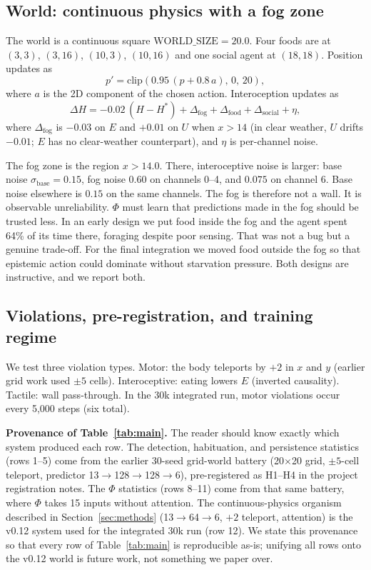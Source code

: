 \documentclass[11pt,a4paper]{article}
\begin{document}
\subsection{World: continuous physics with a fog zone}

The world is a continuous square $\mathrm{WORLD\_SIZE}=20.0$. Four foods are at $(3,3)$, $(3,16)$, $(10,3)$, $(10,16)$ and one social agent at $(18,18)$. Position updates as
\begin{equation}
p' = \mathrm{clip}(0.95 \,(p + 0.8\,a),\, 0,\, 20),
\end{equation}
where $a$ is the 2D component of the chosen action. Interoception updates as
\begin{equation}
\Delta H = -0.02\,(H-H^*) + \Delta_{\mathrm{fog}} + \Delta_{\mathrm{food}} + \Delta_{\mathrm{social}} + \eta,
\end{equation}
where $\Delta_{\mathrm{fog}}$ is $-0.03$ on $E$ and $+0.01$ on $U$ when $x>14$ (in clear weather, $U$ drifts $-0.01$; $E$ has no clear-weather counterpart), and $\eta$ is per-channel noise.

The fog zone is the region $x>14.0$. There, interoceptive noise is larger: base noise $\sigma_{\mathrm{base}}=0.15$, fog noise $0.60$ on channels 0--4, and $0.075$ on channel 6. Base noise elsewhere is $0.15$ on the same channels. The fog is therefore not a wall. It is observable unreliability. $\Phi$ must learn that predictions made in the fog should be trusted less. In an early design we put food inside the fog and the agent spent 64\% of its time there, foraging despite poor sensing. That was not a bug but a genuine trade-off. For the final integration we moved food outside the fog so that epistemic action could dominate without starvation pressure. Both designs are instructive, and we report both.

\subsection{Violations, pre-registration, and training regime}

We test three violation types. Motor: the body teleports by $+2$ in $x$ and $y$ (earlier grid work used $\pm5$ cells). Interoceptive: eating lowers $E$ (inverted causality). Tactile: wall pass-through. In the 30k integrated run, motor violations occur every 5,000 steps (six total).

\textbf{Provenance of Table~\ref{tab:main}.} The reader should know exactly which system produced each row. The detection, habituation, and persistence statistics (rows 1--5) come from the earlier 30-seed grid-world battery (20$\times$20 grid, $\pm5$-cell teleport, predictor 13$\rightarrow$128$\rightarrow$128$\rightarrow$6), pre-registered as H1--H4 in the project registration notes. The $\Phi$ statistics (rows 8--11) come from that same battery, where $\Phi$ takes 15 inputs without attention. The continuous-physics organism described in Section~\ref{sec:methods} (13$\rightarrow$64$\rightarrow$6, $+2$ teleport, attention) is the v0.12 system used for the integrated 30k run (row 12). We state this provenance so that every row of Table~\ref{tab:main} is reproducible as-is; unifying all rows onto the v0.12 world is future work, not something we paper over.
\end{document}
